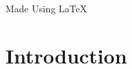 \documentclass[12pt]{article}
\begin{document}
\begin{titlepage}
	
	
	\vfill\vfill\vfill %
	
	{\large Made Using LaTeX} %
	
	
	 
	
	\vfill %
	
\end{titlepage}
\tableofcontents
\cleardoublepage

\section{Introduction}\label{sec:intro}
\end{document}
